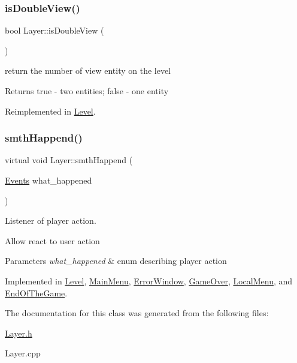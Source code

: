 \subsubsection{\texorpdfstring{is\+Double\+View()}{isDoubleView()}}
{\footnotesize\ttfamily bool Layer\+::is\+Double\+View (\begin{DoxyParamCaption}{ }\end{DoxyParamCaption})\hspace{0.3cm}{\ttfamily [virtual]}}



return the number of view entity on the level 

\begin{DoxyReturn}{Returns}
\textquotesingle{}true\textquotesingle{} -\/ two entities; \textquotesingle{}false\textquotesingle{} -\/ one entity 
\end{DoxyReturn}


Reimplemented in \hyperlink{class_level_ae3584a92caee4cf544abd2c4f946cb18}{Level}.

\mbox{\label{class_layer_a41318993a0f6c7ba3bc6d964f7802c10}} 
\subsubsection{\texorpdfstring{smth\+Happend()}{smthHappend()}}
{\footnotesize\ttfamily virtual void Layer\+::smth\+Happend (\begin{DoxyParamCaption}\item[{\hyperlink{_events_8h_af60e00b78607064c5be6aa9397ea49c1}{Events}}]{what\+\_\+happened }\end{DoxyParamCaption})\hspace{0.3cm}{\ttfamily [pure virtual]}}



Listener of player action. 

Allow react to user action 
\begin{DoxyParams}{Parameters}
{\em what\+\_\+happened} & enum describing player action \\
\hline
\end{DoxyParams}


Implemented in \hyperlink{class_level_a4e898cb21d15947077dbedfb979c63be}{Level}, \hyperlink{class_main_menu_aa4272e1cb2c70c23c869d301f2dd2110}{Main\+Menu}, \hyperlink{class_error_window_af9096dfdd53c4e788e62ce543f939f01}{Error\+Window}, \hyperlink{class_game_over_a919e7ac37c476bf288f732f9a8106016}{Game\+Over}, \hyperlink{class_local_menu_ad6db1f0ae5757a4e25269d40f6e369af}{Local\+Menu}, and \hyperlink{class_end_of_the_game_a88ac00a6aaa5193c7642d9ea2c6be688}{End\+Of\+The\+Game}.



The documentation for this class was generated from the following files\+:\begin{DoxyCompactItemize}
\item 
\hyperlink{_layer_8h}{Layer.\+h}\item 
Layer.\+cpp\end{DoxyCompactItemize}
